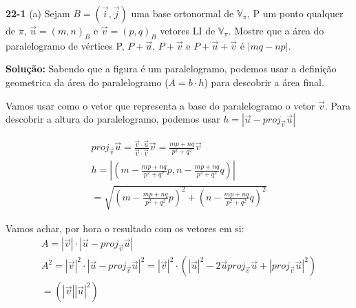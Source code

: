 \newcommand{\Vp}{\mathbb{V}_{\pi}}
\textbf{22-1} (a) Sejam $B = (\vec{i}, \vec{j})$ uma base ortonormal de $\Vp$, P um ponto qualquer de $\pi$, $\vec{u} = (m, n)_B$ e $\vec{v} = (p, q)_B$ vetores LI de $\Vp$. Mostre que a área do paralelogramo de vértices P, $P + \vec{u}$, $P + \vec{v}$ e $P + \vec{u} + \vec{v}$ é $|mq - np|$.

\textbf{Solução:}
Sabendo que a figura é um paralelogramo, podemos usar a definição geometrica da área do paralelogramo ($A = b \cdot h$) para descobrir a área final.

\newcommand{\puv}{proj_{\vec{v}}\vec{u}}
Vamos usar como o vetor que representa a base do paralelogramo o vetor $\vec{v}$. Para descobrir a altura do paralelogramo, podemos usar $h = |\vec{u}-\puv|$

\newcommand{\cof}{\frac{mp + nq}{p^2 + q^2}}
\newcommand{\h}{\sqrt{(m - \cof p)^2 + (n - \cof q)^2}}
\begin{equation}
    \begin{split}
        \puv = \frac{\vec{v} \cdot \vec{u}}{\vec{v} \cdot \vec{v}} \vec{v} = \cof \vec{v} \\
        h = |(
            m - \cof p,
            n - \cof q
        )| \\
         = \h
    \end{split}
\end{equation}

Vamos achar, por hora o resultado com os vetores em si:
\begin{equation}
    \begin{split}
        A = |\vec{v}| \cdot |\vec{u} - \puv| \\
        A^2 = |\vec{v}|^2 \cdot |\vec{u} - \puv|^2 = |\vec{v}|^2 \cdot (|\vec{u}|^2 - 2\vec{u}\puv + |\puv|^2) \\
        = (|\vec{v}||\vec{u}|^2)
    \end{split}
\end{equation}
